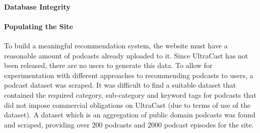\documentclass[../report.tex]{subfiles}
\begin{document}
\paragraph{Database Integrity}

\paragraph{Populating the Site}

To build a meaningful recommendation system, the website must have a reasonable amount of podcasts already uploaded to it.
Since UltraCast has not been released, there are no users to generate this data.
To allow for experimentation with different approaches to recommending podcasts to users, a podcast dataset was scraped.
It was difficult to find a suitable dataset that contained the required category, sub-category and keyword tags for podcasts that did not impose commercial obligations on UltraCast (due to terms of use of the dataset).
A dataset which is an aggregation of public domain podcasts was found and scraped, providing over 200 podcasts and 2000 podcast episodes for the site.



\end{document}
